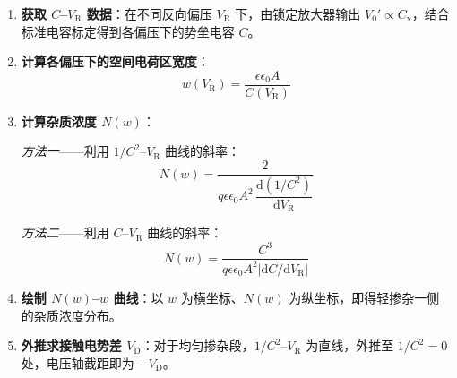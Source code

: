 \begin{enumerate}
  \item \textbf{获取 $C$--$V_{\mathrm{R}}$ 数据}：在不同反向偏压 $V_{\mathrm{R}}$ 下，由锁定放大器输出 $V_{0}' \propto C_{\mathrm{x}}$，结合标准电容标定得到各偏压下的势垒电容 $C$。

  \item \textbf{计算各偏压下的空间电荷区宽度}：
  \begin{equation}
  w(V_{\mathrm{R}}) = \frac{\epsilon\epsilon_0 A}{C(V_{\mathrm{R}})}
  \end{equation}

  \item \textbf{计算杂质浓度 $N(w)$}：

  \textit{方法一}——利用 $1/C^{2}$--$V_{\mathrm{R}}$ 曲线的斜率：
  \begin{equation}
  N(w) = \frac{2}{q\epsilon\epsilon_0 A^{2}\,\dfrac{\mathrm{d}(1/C^{2})}{\mathrm{d}V_{\mathrm{R}}}}
  \end{equation}

  \textit{方法二}——利用 $C$--$V_{\mathrm{R}}$ 曲线的斜率：
  \begin{equation}
  N(w) = \frac{C^{3}}{q\epsilon\epsilon_0 A^{2}\left|\mathrm{d}C/\mathrm{d}V_{\mathrm{R}}\right|}
  \end{equation}

  \item \textbf{绘制 $N(w)$--$w$ 曲线}：以 $w$ 为横坐标、$N(w)$ 为纵坐标，即得轻掺杂一侧的杂质浓度分布。

  \item \textbf{外推求接触电势差 $V_{\mathrm{D}}$}：对于均匀掺杂段，$1/C^{2}$--$V_{\mathrm{R}}$ 为直线，外推至 $1/C^{2}=0$ 处，电压轴截距即为 $-V_{\mathrm{D}}$。
\end{enumerate}
